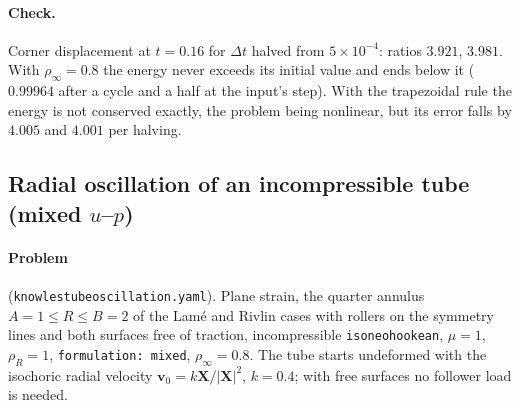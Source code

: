 \documentclass[11pt]{article}
\newcommand{\bX}{\bm{X}}
\DeclareRobustCommand{\code}[1]{{\def\_{\textunderscore\allowbreak}\texttt{#1}}}
\DeclareRobustCommand{\file}[1]{{\def\_{\textunderscore\allowbreak}\texttt{#1}}}
\begin{document}
\paragraph{Check.}  Corner displacement at $t = 0.16$ for $\Delta t$ halved
from $5\times10^{-4}$: ratios $3.921$, $3.981$.  With $\rho_\infty = 0.8$
the energy never exceeds its initial value and ends below it ($0.99964$
after a cycle and a half at the input's step).  With the trapezoidal rule
the energy is not conserved exactly, the problem being nonlinear, but its
error falls by $4.005$ and $4.001$ per halving.

\subsection{Radial oscillation of an incompressible tube (mixed $u$--$p$)}
\label{sec:knowles}
\paragraph{Problem} (\file{knowles\_tube\_oscillation.yaml}).  Plane strain,
the quarter annulus $A = 1 \le R \le B = 2$ of the Lam\'e and Rivlin cases
with rollers on the symmetry lines and both surfaces free of traction,
incompressible \code{iso\_neo\_hookean}, $\mu = 1$, $\rho_R = 1$,
\code{formulation: mixed}, $\rho_\infty = 0.8$.  The tube starts undeformed
with the isochoric radial velocity $\bm v_0 = k\bX/|\bX|^2$, $k = 0.4$; with
free surfaces no follower load is needed.
\end{document}
